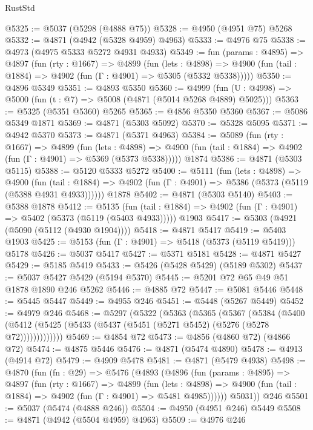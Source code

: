 \begin{lexlean}{RustStd}
\begin{coremodule}
{\begin{coremodule}
{{{{{{{{{{{{{{{{{{{{{{{{{{{{{@5325 := @5037 (@5298 (@4888 @75))
@5328 := @4950 (@4951 @75) @5268
@5332 := @4871 (@4942 (@5328 @4959) @4963)
@5333 := @4976 @75
@5338 := @4973 (@4975 @5333 @5272 @4931 @4933)
@5349 := fun (params : @4895) =>
  @4897
    (fun (rty : @1667) =>
    @4899
      (fun (lets : @4898) =>
      @4900 (fun (tail : @1884) => @4902 (fun (Γ : @4901) => @5305 (@5332 @5338)))))
@5350 := @4896 @5349
@5351 := @4893 @5350
@5360 := @4999 (fun (U : @4998) => @5000 (fun (t : @7) => @5008 (@4871 (@5014 @5268 @4889) @5025)))
@5363 := @5325 (@5351 @5360) @5265
@5365 := @4856 @5350 @5360
@5367 := @5086 @5349 @1871
@5369 := @4871 (@5303 @5092)
@5370 := @5328 @5095
@5371 := @4942 @5370
@5373 := @4871 (@5371 @4963)
@5384 := @5089
    (fun (rty : @1667) =>
    @4899
      (fun (lets : @4898) =>
      @4900 (fun (tail : @1884) => @4902 (fun (Γ : @4901) => @5369 (@5373 @5338)))))
    @1874
@5386 := @4871 (@5303 @5115)
@5388 := @5120 @5333 @5272
@5400 := @5111
    (fun (lets : @4898) =>
    @4900
      (fun (tail : @1884) => @4902 (fun (Γ : @4901) => @5386 (@5373 (@5119 (@5388 @4931 @4933))))))
    @1878
@5402 := @4871 (@5303 @5140)
@5403 := @5388 @1878
@5412 := @5135
    (fun (tail : @1884) => @4902 (fun (Γ : @4901) => @5402 (@5373 (@5119 (@5403 @4933)))))
    @1903
@5417 := @5303 (@4921 (@5090 (@5112 (@4930 @1904))))
@5418 := @4871 @5417
@5419 := @5403 @1903
@5425 := @5153 (fun (Γ : @4901) => @5418 (@5373 (@5119 @5419))) @5178
@5426 := @5037 @5417
@5427 := @5371 @5181
@5428 := @4871 @5427
@5429 := @5185 @5419
@5433 := @5426 (@5428 @5429) (@5189 @5302)
@5437 := @5037 @5427 @5429 (@5194 @5370)
@5445 := @5201 @72 @65 @49 @51 @1878 @1890 @246 @5262
@5446 := @4885 @72
@5447 := @5081 @5446
@5448 := @5445 @5447
@5449 := @4955 @246
@5451 := @5448 (@5267 @5449)
@5452 := @4979 @246
@5468 := @5297
    (@5322
      (@5363
        (@5365
          (@5367
            (@5384
              (@5400 (@5412 (@5425 (@5433 (@5437 (@5451 (@5271 @5452) (@5276 (@5278 @72)))))))))))))
@5469 := @4854 @72
@5473 := @4856 (@4860 @72) (@4866 @72)
@5474 := @4875 @5446
@5476 := @4871 (@5474 @4890)
@5478 := @4913 (@4914 @72)
@5479 := @4909 @5478
@5481 := @4871 (@5479 @4938)
@5498 := @4870
    (fun (fn : @29) =>
    @5476
      (@4893
        (@4896
          (fun (params : @4895) =>
          @4897
            (fun (rty : @1667) =>
            @4899
              (fun (lets : @4898) =>
              @4900 (fun (tail : @1884) => @4902 (fun (Γ : @4901) => @5481 @4985))))))
        @5031))
    @246
@5501 := @5037 (@5474 (@4888 @246))
@5504 := @4950 (@4951 @246) @5449
@5508 := @4871 (@4942 (@5504 @4959) @4963)
@5509 := @4976 @246
}}}}}}}}}}}}}}}}}}}}}}}}}}}}}
\end{coremodule}}
\end{coremodule}
\end{lexlean}
